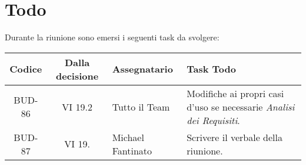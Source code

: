 
\section{Todo}

Durante la riunione sono emersi i seguenti task da svolgere:

\vspace{0.5cm}

\begin{table}[htbp]
\centering
{}
\begin{tabular}{|c|c|p{}|p{}|}
    \hline
    \rowcolor[gray]{0.75}
    \textbf{Codice} & \textbf{Dalla decisione} & \textbf{Assegnatario} & \textbf{Task Todo} \\
    \hline
    BUD-86 & VI 19.2 & Tutto il Team & Modifiche ai propri casi d'uso se necessarie \emph{Analisi dei Requisiti}. \\
    \hline
    BUD-87 & VI 19. & Michael Fantinato & Scrivere il verbale della riunione. \\
\end{tabular}
\end{table}